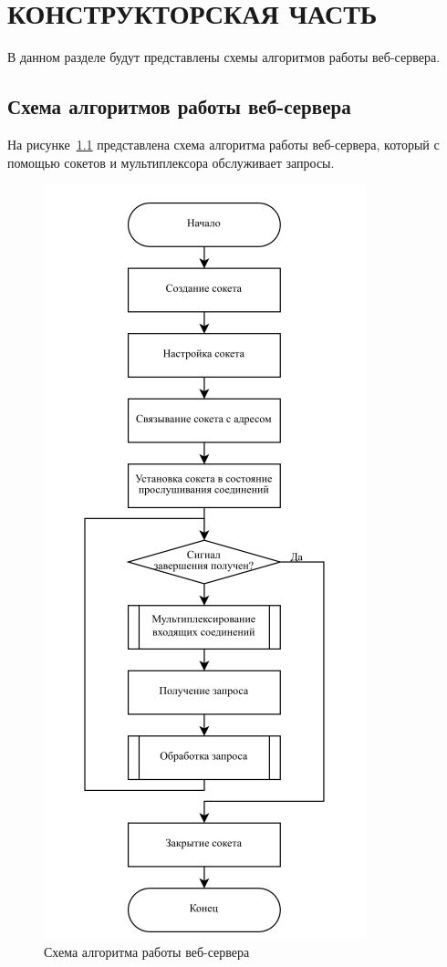 \chapter{КОНСТРУКТОРСКАЯ ЧАСТЬ}

В данном разделе будут представлены схемы алгоритмов работы веб-сервера.

\section{Схема алгоритмов работы веб-сервера}

На рисунке~\ref{fig:algo-web-server} представлена схема алгоритма работы веб-сервера, который с помощью сокетов и мультиплексора обслуживает запросы.

\begin{figure}[H]
	\centering
	\includegraphics[width=0.45\linewidth]{csv/algo-web-server}
	\caption{Схема алгоритма работы веб-сервера}
	\label{fig:algo-web-server}
\end{figure}


